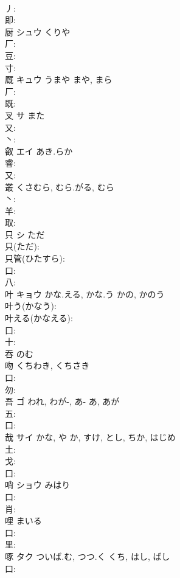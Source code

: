 \documentclass[8pt]{extreport}
\begin{document}
\begin{CJK}{UTF8}{min}
\\	丿: 
\\	即: 
\\	厨	シュウ	くりや		
\\	厂: 
\\	豆: 
\\	寸: 
\\	厩	キュウ	うまや	まや, まら	
\\	厂: 
\\	既: 
\\	叉	サ	また		
\\	又: 
\\	丶: 
\\	叡	エイ	あき.らか		
\\	睿: 
\\	又: 
\\	叢		くさむら, むら.がる, むら			
\\	丶: 
\\	羊: 
\\	取: 
\\	只	シ	ただ		
\\	只(ただ): 
\\	只管(ひたすら): 
\\	口: 
\\	八: 
\\	叶	キョウ	かな.える, かな.う	かの, かのう	
\\	叶う(かなう): 
\\	叶える(かなえる): 
\\	口: 
\\	十: 
\\	吞		のむ				
\\	吻		くちわき, くちさき			
\\	口: 
\\	勿: 
\\	吾	ゴ	われ, わが-, あ-	あ, あが	
\\	五: 
\\	口: 
\\	哉	サイ	かな, や	か, すけ, とし, ちか, はじめ	
\\	土: 
\\	戈: 
\\	口: 
\\	哨	ショウ	みはり		
\\	口: 
\\	肖: 
\\	哩		まいる			
\\	口: 
\\	里: 
\\	啄	タク	ついば.む, つつ.く	くち, はし, ばし	
\\	口: 

\end{CJK}
\end{document}
